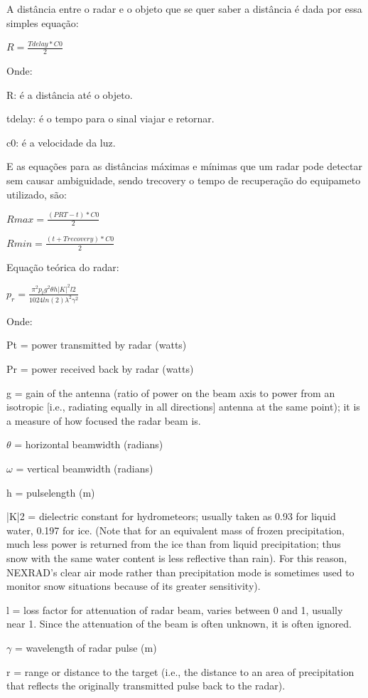 A distância entre o radar e o objeto que se quer saber a distância é dada por essa simples equação:

$ R = \displaystyle\frac{Tdelay * C0}{2}$

Onde:

	R: é a distância até o objeto.

	tdelay: é o tempo para o sinal viajar e retornar.

	c0: é a velocidade da luz.

  E as equações para as distâncias máximas e mínimas que um radar pode detectar sem
  causar ambiguidade, sendo trecovery o tempo de recuperação do equipameto
   utilizado, são:


$ Rmax = \frac{(PRT - t) * C0}{2}$

$ Rmin = \frac{(t + Trecovery) * C0}{2}$




Equação teórica do radar:

$p_{r} = \frac{\pi ^{2}p_{t}g^{2}\theta h |K|^{2}l2}{1024ln(2)\lambda ^{2}\gamma ^{2}}$

Onde:

Pt = power transmitted by radar (watts)

Pr = power received back by radar (watts)

g = gain of the antenna (ratio of power on the beam axis to power from an isotropic [i.e.,
radiating equally in all directions] antenna at the same point); it is a measure
of how focused the radar beam is.

$\theta$ = horizontal beamwidth (radians)

$\omega$ = vertical beamwidth (radians)

h = pulselength (m)

|K|2 = dielectric constant for hydrometeors; usually taken as 0.93 for liquid water, 0.197 for
 ice. (Note that for an equivalent mass of frozen precipitation, much less power is returned
 from the ice than from liquid precipitation; thus snow with the same water content is
  less reflective than rain). For this reason, NEXRAD’s clear air mode rather than
  precipitation mode is sometimes used to monitor snow situations because of its greater
  sensitivity).

l = loss factor for attenuation of radar beam, varies between 0 and 1, usually near 1.
 Since the attenuation of the beam is often unknown, it is often ignored.

$\gamma$ = wavelength of radar pulse (m)

r = range or distance to the target (i.e., the distance to an area of precipitation
that reflects the originally transmitted pulse back to the radar).

